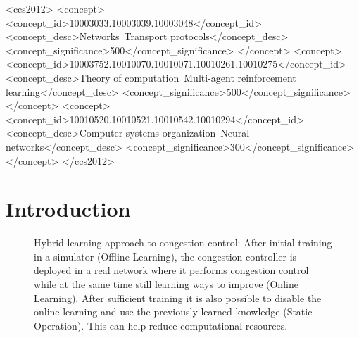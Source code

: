 \documentclass[10pt,sigconf,anonymous]{acmart}
\begin{document}
%
%
\begin{CCSXML}
<ccs2012>
<concept>
<concept_id>10003033.10003039.10003048</concept_id>
<concept_desc>Networks~Transport protocols</concept_desc>
<concept_significance>500</concept_significance>
</concept>
<concept>
<concept_id>10003752.10010070.10010071.10010261.10010275</concept_id>
<concept_desc>Theory of computation~Multi-agent reinforcement learning</concept_desc>
<concept_significance>500</concept_significance>
</concept>
<concept>
<concept_id>10010520.10010521.10010542.10010294</concept_id>
<concept_desc>Computer systems organization~Neural networks</concept_desc>
<concept_significance>300</concept_significance>
</concept>
</ccs2012>
\end{CCSXML}




\maketitle%

\section{Introduction}

\begin{figure}



\caption{Hybrid learning approach to congestion control: After initial training in a simulator (Offline Learning), the congestion controller is deployed in a real network where it performs congestion control while at the same time still learning ways to improve (Online Learning). After sufficient training it is also possible to disable the online learning and use the previously learned knowledge (Static Operation). This can help reduce computational resources.}
\label{fig:concept}
\end{figure}
\end{document}
